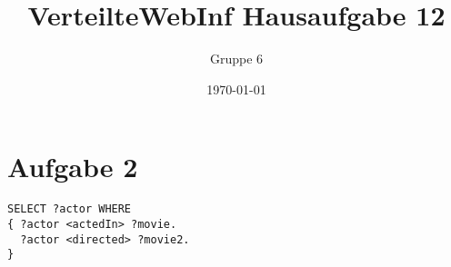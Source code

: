 \documentclass[a4paper]{scrartcl}
\author{Gruppe 6}
\title{\textbf{VerteilteWebInf Hausaufgabe 12}}
\date{\today}
\begin{document}
\maketitle

\section*{Aufgabe 2}
\begin{verbatim}
SELECT ?actor WHERE
{ ?actor <actedIn> ?movie.
  ?actor <directed> ?movie2.
}
\end{verbatim}
\end{document}
